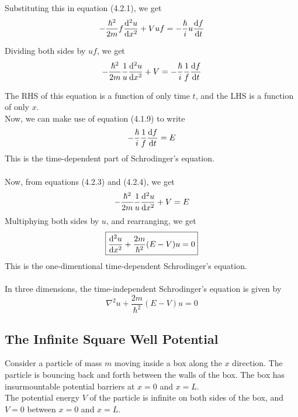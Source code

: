 \documentclass[12pt]{article}
\numberwithin{equation}{subsection}
\begin{document}
Substituting this in equation (4.2.1), we get
\begin{equation}
    -\frac{\hbar^2}{2m} f \dv[2]{u}{x} + Vuf = -\frac{\hbar}{i} u \dv{f}{t}
\end{equation}

Dividing both sides by $uf$, we get
\begin{equation}
    -\frac{\hbar^2}{2m} \frac{1}{u} \dv[2]{u}{x} + V = -\frac{\hbar}{i} \frac{1}{f} \dv{f}{t}
\end{equation}

The RHS of this equation is a function of only time $t$, and the LHS is a function of only $x$. \\
Now, we can make use of equation (4.1.9) to write
\begin{equation}
    -\frac{\hbar}{i} \frac{1}{f} \dv{f}{t} = E
\end{equation}
This is the time-dependent part of Schrodinger's equation.\\~\\
Now, from equations (4.2.3) and (4.2.4), we get
\begin{equation}
    -\frac{\hbar^2}{2m} \frac{1}{u} \dv[2]{u}{x} + V = E
\end{equation}
Multiphying both sides by $u$, and rearranging, we get
\begin{equation}
    \boxed{ \dv[2]{u}{x} + \frac{2m}{\hbar^2} (E-V)u = 0 }
\end{equation}
This is the one-dimentional time-dependent Schrodinger's equation.\\~\\
In three dimensions, the time-independent Schrodinger's equation is given by
\begin{equation}
    \boxed{ \nabla^2 u + \frac{2m}{\hbar^2} (E-V)u = 0 }
\end{equation}

\subsection{The Infinite Square Well Potential}
Consider a particle of mass $m$ moving inside a box along the $x$ direction. The particle is bouncing back and forth between the walls of the box. The box has insurmountable potential barriers at $x=0$ and $x=L$.\\
The potential energy $V$ of the particle is infinite on both sides of the box, and $V=0$ between $x=0$ and $x=L$.\\~\\
\end{document}
